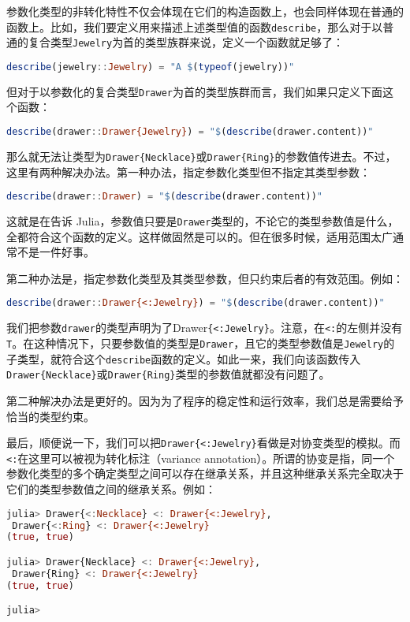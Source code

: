 参数化类型的非转化特性不仅会体现在它们的构造函数上，也会同样体现在普通的函数上。比如，我们要定义用来描述上述类型值的函数\verb|describe|，那么对于以普通的复合类型\verb|Jewelry|为首的类型族群来说，定义一个函数就足够了：
\begin{lstlisting}[language=julia]
describe(jewelry::Jewelry) = "A $(typeof(jewelry))"
\end{lstlisting}

但对于以参数化的复合类型\verb|Drawer|为首的类型族群而言，我们如果只定义下面这个函数：
\begin{lstlisting}[language=julia]
describe(drawer::Drawer{Jewelry}) = "$(describe(drawer.content))"
\end{lstlisting}

那么就无法让类型为\verb|Drawer{Necklace}|或\verb|Drawer{Ring}|的参数值传进去。不过，这里有两种解决办法。第一种办法，指定参数化类型但不指定其类型参数：
\begin{lstlisting}[language=julia]
describe(drawer::Drawer) = "$(describe(drawer.content))"
\end{lstlisting}

这就是在告诉 Julia，参数值只要是\verb|Drawer|类型的，不论它的类型参数值是什么，全都符合这个函数的定义。这样做固然是可以的。但在很多时候，适用范围太广通常不是一件好事。

第二种办法是，指定参数化类型及其类型参数，但只约束后者的有效范围。例如：
\begin{lstlisting}[language=julia]
describe(drawer::Drawer{<:Jewelry}) = "$(describe(drawer.content))"
\end{lstlisting}

我们把参数\verb|drawer|的类型声明为了Drawer\verb|{<:Jewelry}|。注意，在\verb|<:|的左侧并没有\verb|T|。在这种情况下，只要参数值的类型是\verb|Drawer|，且它的类型参数值是\verb|Jewelry|的子类型，就符合这个\verb|describe|函数的定义。如此一来，我们向该函数传入\verb|Drawer{Necklace}|或\verb|Drawer{Ring}|类型的参数值就都没有问题了。

第二种解决办法是更好的。因为为了程序的稳定性和运行效率，我们总是需要给予恰当的类型约束。

最后，顺便说一下，我们可以把\verb|Drawer{<:Jewelry}|看做是对协变类型的模拟。而\verb|<:|在这里可以被视为转化标注（variance annotation）。所谓的协变是指，同一个参数化类型的多个确定类型之间可以存在继承关系，并且这种继承关系完全取决于它们的类型参数值之间的继承关系。例如：
\begin{lstlisting}[language=julia]
julia> Drawer{<:Necklace} <: Drawer{<:Jewelry},
 Drawer{<:Ring} <: Drawer{<:Jewelry}
(true, true)

julia> Drawer{Necklace} <: Drawer{<:Jewelry},
 Drawer{Ring} <: Drawer{<:Jewelry}
(true, true)

julia> 
\end{lstlisting}

